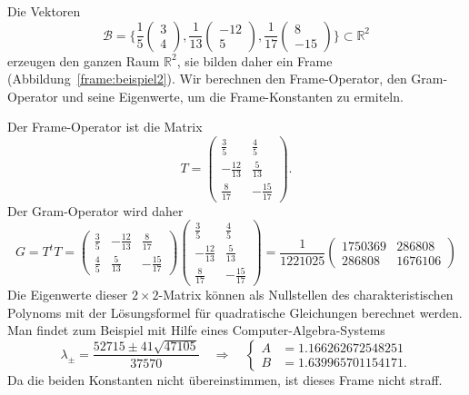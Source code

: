 \begin{beispiel}
Die Vektoren
\[
\mathcal{B} 
=
\biggl\{
\frac15
\begin{pmatrix} 3\\4\end{pmatrix},
\frac1{13}
\begin{pmatrix} -12\\5\end{pmatrix},
\frac1{17}
\begin{pmatrix} 8\\-15\end{pmatrix}
\biggr\}
\subset \mathbb R^2
\]
erzeugen den ganzen Raum $\mathbb R^2$, sie bilden daher ein
Frame (Abbildung~\ref{frame:beispiel2}).
Wir berechnen den Frame-Operator, den Gram-Operator und seine Eigenwerte,
um die Frame-Konstanten zu ermiteln.

Der Frame-Operator ist die Matrix
\[
T
=
\begin{pmatrix}
 \frac{ 3}{ 5}& \frac{ 4}{ 5}\\[2pt]
-\frac{12}{13}& \frac{ 5}{13}\\[2pt]
 \frac{ 8}{17}&-\frac{15}{17}
\end{pmatrix}.
\]
Der Gram-Operator wird daher
\[
G=T^tT
=
\begin{pmatrix}
 \frac{ 3}{ 5}&-\frac{12}{13}&  \frac{ 8}{17}\\[2pt]
 \frac{ 4}{ 5}& \frac{ 5}{13}& -\frac{15}{17}
\end{pmatrix}
\begin{pmatrix}
 \frac{ 3}{ 5}& \frac{ 4}{ 5}\\[2pt]
-\frac{12}{13}& \frac{ 5}{13}\\[2pt]
 \frac{ 8}{17}&-\frac{15}{17}
\end{pmatrix}
=
\frac{1}{1221025}
\begin{pmatrix}
1750369&  286808 \\
 286808& 1676106
\end{pmatrix}
\]
Die Eigenwerte dieser $2\times 2$-Matrix können als Nullstellen des
charakteristischen Polynoms mit der Lösungsformel für quadratische
Gleichungen berechnet werden.
Man findet zum Beispiel mit Hilfe eines Computer-Algebra-Systems
\[
\lambda_{\pm}
=
\frac{52715\pm 41\sqrt{47105}}{37570}
\quad\Rightarrow\quad
\left\{
\begin{aligned}
A&=
1.166262672548251
\\
B&=
1.639965701154171.
\end{aligned}
\right.
\]
Da die beiden Konstanten nicht übereinstimmen, ist dieses Frame
nicht straff.
\end{beispiel}


